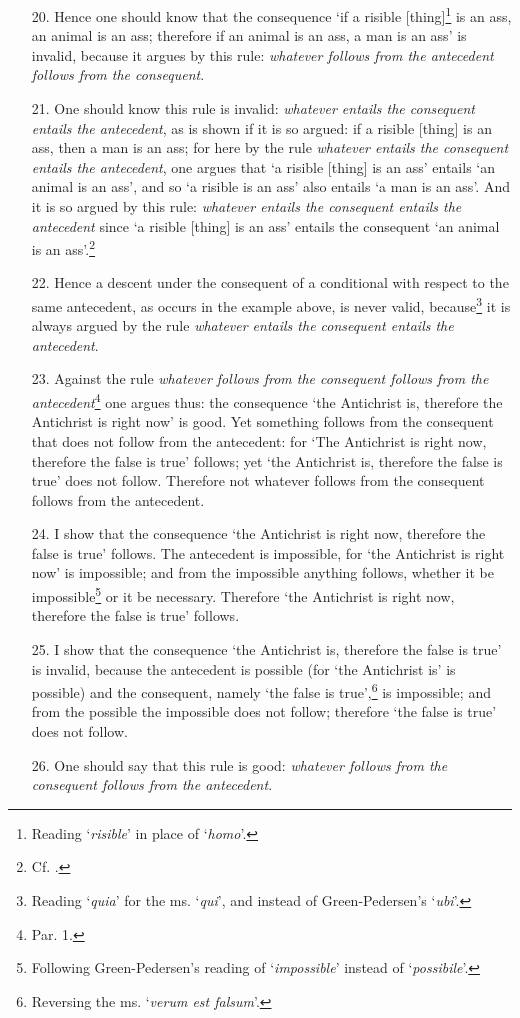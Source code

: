 \begin{enumerate}
\item[20.] Hence one should know that the consequence `if a risible [thing]\footnote{Reading `\textit{risible}' in place of `\textit{homo}'.} is an ass, an animal is an ass; therefore if an animal is an ass, a man is an ass' is invalid, because it argues by this rule: \textit{whatever follows from the antecedent follows from the consequent}.
\item[21.] One should know this rule is invalid: \textit{whatever entails the consequent entails the antecedent}, as is shown if it is so argued: if a risible [thing] is an ass, then a man is an ass; for here by the rule \textit{whatever entails the consequent entails the antecedent}, one argues that `a risible [thing] is an ass' entails `an animal is an ass', and so `a risible is an ass' also entails `a man is an ass'. And it is so argued by this rule: \textit{whatever entails the consequent entails the antecedent} since `a risible [thing] is an ass' entails the consequent `an animal is an ass'.\footnote{Cf. \cite[pp. 80.13-29, 84.8-86.21]{BurleyDPAL}.}
\item[22.] Hence a descent under the consequent of a conditional with respect to the same antecedent, as occurs in the example above, is never valid, because\footnote{Reading `\textit{quia}' for the ms. `\textit{qui}', and instead of Green-Pedersen's `\textit{ubi}'.} it is always argued by the rule \textit{whatever entails the consequent entails the antecedent}.
\item[23.] Against the rule \textit{whatever follows from the consequent follows from the antecedent}\footnote{Par. 1.} one argues thus: the consequence `the Antichrist is, therefore the Antichrist is right now' is good. Yet something follows from the consequent that does not follow from the antecedent: for `The Antichrist is right now, therefore the false is true' follows; yet `the Antichrist is, therefore the false is true' does not follow. Therefore not whatever follows from the consequent follows from the antecedent.
\item[24.] I show that the consequence `the Antichrist is right now, therefore the false is true' follows. The antecedent is impossible, for `the Antichrist is right now' is impossible; and from the impossible anything follows, whether it be impossible\footnote{Following Green-Pedersen's reading of `\textit{impossible}' instead of `\textit{possibile}'.} or it be necessary. Therefore `the Antichrist is right now, therefore the false is true' follows.
\item[25.] I show that the consequence `the Antichrist is, therefore the false is true' is invalid, because the antecedent is possible (for `the Antichrist is' is possible) and the consequent, namely `the false is true',\footnote{Reversing the ms. `\textit{verum est falsum}'.} is impossible; and from the possible the impossible does not follow; therefore `the false is true' does not follow.
\item[26.] One should say that this rule is good: \textit{whatever follows from the consequent follows from the antecedent}. 


\end{enumerate}
